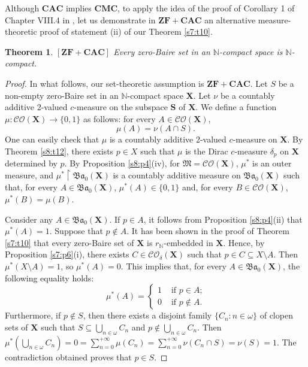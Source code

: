 \documentclass[12pt,twoside,leqno]{article}
\theoremstyle{plain}
\newtheorem{theorem}{Theorem}[section]
\theoremstyle{definition}
\theoremstyle{remark}
\begin{document}
Although $\mathbf{CAC}$ implies $\mathbf{CMC}$, to apply the idea of the proof of Corollary 1 of Chapter VIII.4 in \cite{nag}, let us demonstrate in $\mathbf{ZF+CAC}$ an alternative measure-theoretic proof of statement (ii) of our Theorem \ref{s7:t10}. 

\begin{theorem}
	\label{s8:t13}
	$[\mathbf{ZF+CAC}]$
	Every zero-Baire set in an $\mathbb{N}$-compact space is $\mathbb{N}$-compact.
\end{theorem}
\begin{proof}
	In what follows, our set-theoretic assumption is $\mathbf{ZF+CAC}$. Let $S$ be a non-empty zero-Baire set in an $\mathbb{N}$-compact space $\mathbf{X}$. Let $\nu$ be a countably additive  2-valued $c$-measure on the subspace $\mathbf{S}$ of $\mathbf{X}$. We define a function $\mu:\mathcal{CO}(\mathbf{X})\to\{0,1\}$ as follows: for every $A\in\mathcal{CO}(\mathbf{X})$, 
	$$\mu(A)=\nu(A\cap S).$$
	One can easily check that $\mu$ is a countably additive  2-valued $c$-measure on $\mathbf{X}$. By Theorem \ref{s8:t12}, there exists $p\in X$ such that $\mu$ is the Dirac $c$-measure $\delta_p$ on $\mathbf{X}$ determined by $p$.  By Proposition \ref{s8:p4}(iv), for $\mathfrak{M}=\mathcal{CO}(\mathbf{X})$,  $\mu^{\ast}$ is an outer measure, and $\mu^{\ast}\upharpoonright \mathfrak{Ba}_0(\mathbf{X})$ is a countably additive measure on $\mathfrak{Ba}_{0}(\mathbf{X})$ such that, for every $A\in\mathfrak{Ba}_0(\mathbf{X})$, $\mu^{\ast}(A)\in\{0, 1\}$ and, for every $B\in\mathcal{CO}(\mathbf{X})$, $\mu^{\ast}(B)=\mu(B)$.
	
	Consider any $A\in\mathfrak{Ba}_0(\mathbf{X})$. If $p\in A$, it follows from Proposition \ref{s8:p4}(ii) that $\mu^{\ast}(A)=1$. Suppose that $p\notin A$. It has been shown in the proof of Theorem \ref{s7:t10} that every zero-Baire set of $\mathbf{X}$ is $r_{\mathbb{N}}$-embedded in $\mathbf{X}$. Hence, by Proposition \ref{s7:p6}(i), there exists $C\in\mathcal{CO}_{\delta}(\mathbf{X})$ such that $p\in C\subseteq X\setminus A$. Then $\mu^{\ast}(X\setminus A)=1$, so $\mu^{\ast}(A)=0$.  This implies that, for every $A\in\mathfrak{Ba}_0(\mathbf{X})$, the following equality holds:
	$$
	\mu^{\ast}(A)=\begin{cases} 1 &\text{ if $p\in A$;}\\
		0 &\text{ if $p\notin A$}.\end{cases}
	$$
	Furthermore, if $p\notin S$, then there exists a disjoint family $\{C_n: n\in\omega\}$ of clopen sets of $\mathbf{X}$ such that $S\subseteq\bigcup_{n\in\omega}C_n$ and $p\notin\bigcup_{n\in\omega}C_n$. Then $\mu^{\ast}(\bigcup_{n\in\omega}C_n)=0=\sum\limits_{n=0}^{+\infty}\mu(C_n)=\sum\limits_{n=0}^{+\infty}\nu(C_n\cap S)=\nu(S)=1$. The contradiction obtained proves that $p\in S$.
	

\end{proof}
\end{document}
